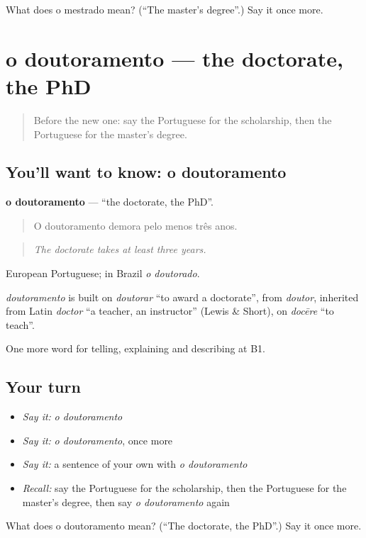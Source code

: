 \begin{tcolorbox}[breakable,colback=teal!4,colframe=teal!35!black,title={Before you move on}]
What does o mestrado mean? (\textquotedblleft{}The master's degree\textquotedblright{}.) Say it once more.
\end{tcolorbox}
\section[o doutoramento]{o doutoramento — the doctorate, the PhD}

\label{lesson:PT-C377-doutoramento}



\begin{quote}
Before the new one: say the Portuguese for the scholarship, then the Portuguese for the master's degree.
\end{quote}

\subsection*{You'll want to know: o doutoramento}
\textbf{o doutoramento} — \textquotedblleft{}the doctorate, the PhD\textquotedblright{}.

\begin{quote}
O doutoramento demora pelo menos três anos.
\end{quote}

\begin{quote}
\emph{The doctorate takes at least three years.}
\end{quote}

European Portuguese; in Brazil \emph{o doutorado}.

\begin{cousinweb}
\emph{doutoramento} is built on \emph{doutorar} \textquotedblleft{}to award a doctorate\textquotedblright{}, from \emph{doutor}, inherited from Latin \emph{doctor} \textquotedblleft{}a teacher, an instructor\textquotedblright{} (Lewis \& Short), on \emph{docēre} \textquotedblleft{}to teach\textquotedblright{}.
\end{cousinweb}

\begin{grammarlens}[title={What you've built}]
One more word for telling, explaining and describing at B1.
\end{grammarlens}

\subsection*{Your turn}
\begin{itemize}
\raggedright
  \item \emph{Say it:} \emph{o doutoramento}
  \item \emph{Say it:} \emph{o doutoramento}, once more
  \item \emph{Say it:} a sentence of your own with \emph{o doutoramento}
  \item \emph{Recall:} say the Portuguese for the scholarship, then the Portuguese for the master's degree, then say \emph{o doutoramento} again
\end{itemize}

\begin{tcolorbox}[breakable,colback=teal!4,colframe=teal!35!black,title={Before you move on}]
What does o doutoramento mean? (\textquotedblleft{}The doctorate, the PhD\textquotedblright{}.) Say it once more.
\end{tcolorbox}
